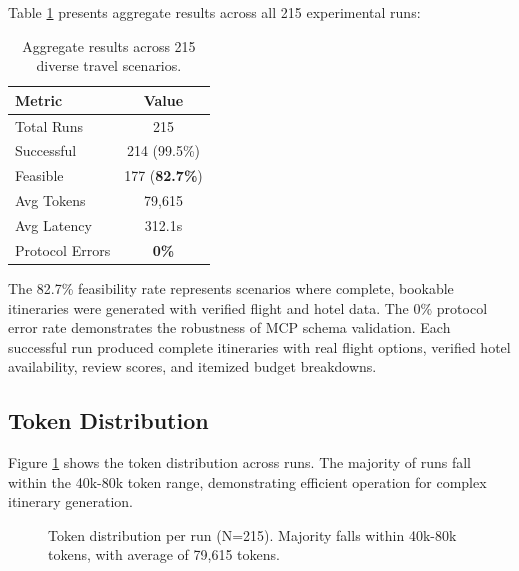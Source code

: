 \documentclass[conference]{IEEEtran}
\begin{document}
Table \ref{tab:results} presents aggregate results across all 215 experimental runs:

\begin{table}[h]
\centering
\begin{tabular}{lc}
\toprule
\textbf{Metric} & \textbf{Value} \\
\midrule
Total Runs & 215 \\
Successful & 214 (99.5\%) \\
Feasible & 177 (\textbf{82.7\%}) \\
Avg Tokens & 79,615 \\
Avg Latency & 312.1s \\
Protocol Errors & \textbf{0\%} \\
\bottomrule
\end{tabular}
\caption{Aggregate results across 215 diverse travel scenarios.}
\label{tab:results}
\end{table}

The 82.7\% feasibility rate represents scenarios where complete, bookable itineraries were generated with verified flight and hotel data. The 0\% protocol error rate demonstrates the robustness of MCP schema validation. Each successful run produced complete itineraries with real flight options, verified hotel availability, review scores, and itemized budget breakdowns.

\subsection{Token Distribution}

Figure \ref{fig:token_dist} shows the token distribution across runs. The majority of runs fall within the 40k-80k token range, demonstrating efficient operation for complex itinerary generation.

\begin{figure}[htbp]
    \centering
    \caption{Token distribution per run (N=215). Majority falls within 40k-80k tokens, with average of 79,615 tokens.}
    \label{fig:token_dist}
\end{figure}
\end{document}
